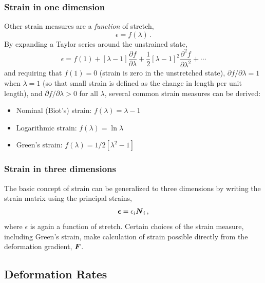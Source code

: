 \documentclass[10pt,letterpaper,oneside]{report}
\newcommand{\ten}[1]{\mbox{\boldmath $#1$}{}}
\begin{document}
\begin{itemize}
\subsubsection{Strain in one dimension}
Other strain measures are a \emph{function} of stretch, 
\begin{equation}
\epsilon = f \left( \lambda \right) \, .
\end{equation}
By expanding a Taylor series around the unstrained state, 
\begin{equation}
\epsilon = f \left( 1 \right) + \left[ \lambda - 1 \right] \frac{\partial f}{\partial \lambda} + \frac{1}{2} \left[ \lambda - 1 \right]^2 \frac{\partial^2 f}{\partial \lambda^2} + \cdots
\end{equation}
and requiring that $f \left( 1 \right) = 0$ (strain is zero in the unstretched state), $\partial f / \partial \lambda = 1$ when $\lambda = 1$ (so that small strain is defined as the change in length per unit length), and $\partial f / \partial \lambda > 0$ for all $\lambda$, several common strain measures can be derived:
\begin{itemize}
\item Nominal (Biot's) strain: $ f \left( \lambda \right) = \lambda - 1$
\item Logarithmic strain: $ f \left( \lambda \right) = \ln \lambda$ 
\item Green's strain: $ f \left( \lambda \right) = 1 / 2 \left[ \lambda^2 - 1 \right]$
\end{itemize}

\subsubsection{Strain in three dimensions}
The basic concept of strain can be generalized to three dimensions by writing the strain matrix using the principal strains, 
\begin{equation}
\ten{ \epsilon } = \epsilon_i \ten{N}_i \, ,
\end{equation}
where $\epsilon$ is again a function of stretch.  Certain choices of the strain measure, including Green's strain, make calculation of strain possible directly from the deformation gradient, $\ten{F}$.  

\subsection{Deformation Rates}


\end{itemize}
\end{document}

